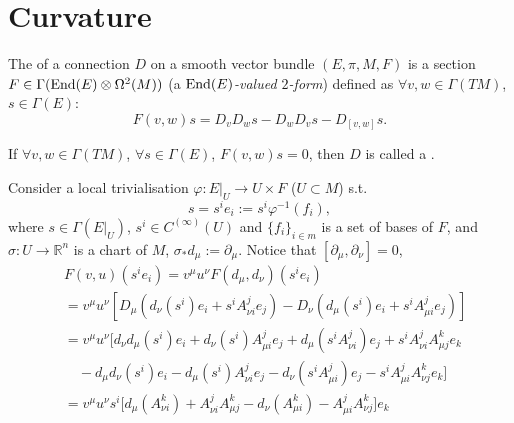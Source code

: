 \documentclass[openany, oneside, a5paper]{book}
\begin{document}
\chapter{Curvature}

\begin{definition}[Curvature]
    The  of a connection $D$ on a smooth vector bundle $(E, \pi, M, F)$ is a section $F \in \Gamma(\operatorname{End}(E) \otimes \Omega^2(M))$ (a \emph{$\operatorname{End}(E)$-valued $2$-form}) defined as $\forall v, w \in \Gamma(TM)$, $s \in \Gamma(E)$:
    \begin{equation}
        F(v, w) s = D_v D_w s - D_w D_v s - D_{[v, w]} s.
    \end{equation} 
\end{definition}

If $\forall v, w \in \Gamma(TM)$, $\forall s \in \Gamma(E)$, $F(v, w) s = 0$, then $D$ is called a .

Consider a local trivialisation $\varphi \colon E|_U \to U \times F$ ($U \subset M$) s.t.\ 
\begin{equation}
    s = s^i e_i := s^i\varphi^{-1}(f_i),
\end{equation}
where $s \in \Gamma(E|_U)$, $s^i \in C^{(\infty)}(U)$ and $\{f_i\}_{i \in m}$ is a set of bases of $F$,
and $\sigma \colon U \to \mathbb R^n$ is a chart of $M$, $\sigma_* d_\mu := \partial_\mu$.
Notice that $[\partial_\mu, \partial_\nu] = 0$,
\begin{equation}
    \begin{aligned}
        &F(v, u) (s^i e_i) 
        = v^\mu u^\nu F(d_\mu, d_\nu) (s^i e_i)
        \\
        &= v^\mu u^\nu [
            D_\mu (d_\nu(s^i)e_i + s^i A_{\nu i}^j e_j)
            - D_\nu (d_\mu(s^i)e_i + s^i A_{\mu i}^j e_j)
        ]
        \\
        &= v^\mu u^\nu \big[
            d_\nu d_\mu (s^i) e_i + d_\nu (s^i) A_{\mu i}^j e_j
            + d_\mu(s^i A_{\nu i}^j) e_j + s^i A_{\nu i}^j A_{\mu j}^k e_k
        \\
        &\quad
        - d_\mu d_\nu(s^i) e_i - d_\mu(s^i) A_{\nu i}^j e_j
        - d_\nu(s^i A_{\mu i}^j) e_j - s^i A_{\mu i}^j A_{\nu j}^k e_k
        \big]
        \\
        &= v^\mu u^\nu s^i\big[ 
            d_\mu (A_{\nu i}^k) + A_{\nu i}^j A_{\mu j}^k
            - d_\nu (A_{\mu i}^k) - A_{\mu i}^j A_{\nu j}^k 
        \big] e_k
    \end{aligned}
\end{equation}
\end{document}
